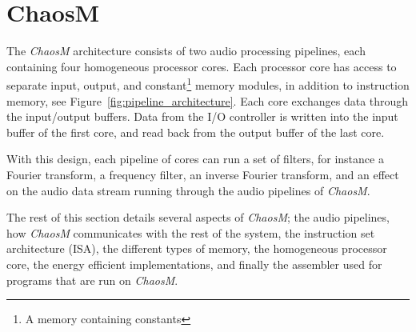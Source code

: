 
\FloatBarrier
\section{ChaosM}\label{chapter:fpga}

The \textit{ChaosM} architecture consists of two audio processing pipelines, each containing four
homogeneous processor cores. Each processor core has access to separate input, output, and constant\footnote{A memory containing constants} memory modules, in addition to instruction memory, see Figure~\ref{fig:pipeline_architecture}. Each core exchanges data
through the input/output buffers. Data from the I/O controller is written into
the input buffer of the first core, and read back from the output buffer of the
last core.

With this design, each pipeline of cores can run a set of filters, for instance
a Fourier transform, a frequency filter, an inverse Fourier transform, and an
effect on the audio data stream running through the audio pipelines of
\textit{ChaosM}.

The rest of this section details several aspects of \textit{ChaosM}; the audio
pipelines, how \textit{ChaosM} communicates with the rest of the system, the
instruction set architecture (ISA), the different types of memory, the homogeneous
processor core, the energy efficient implementations, and finally the assembler
used for programs that are run on \textit{ChaosM}.








